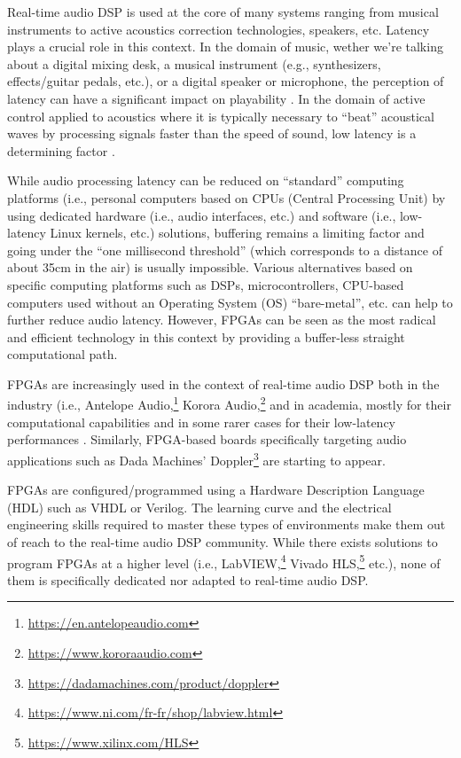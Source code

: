 \documentclass[a4paper,10pt]{article}
\begin{document}
Real-time audio DSP is used at the core of many systems ranging from musical instruments to active acoustics correction technologies, speakers, etc. Latency plays a crucial role in this context.  In the domain of music, wether we're talking about a digital mixing desk, a musical instrument (e.g., synthesizers, effects/guitar pedals, etc.), or a digital speaker or microphone, the perception of latency can have a significant impact on playability \cite{Lago2004}. In the domain of active control applied to acoustics where it is typically necessary to ``beat'' acoustical waves by processing signals faster than the speed of sound, low latency is a determining factor \cite{Zhang2018}.  

While audio processing latency can be reduced on ``standard'' computing platforms (i.e., personal computers based on CPUs (Central Processing Unit) by using dedicated hardware (i.e., audio interfaces, etc.) and software (i.e., low-latency Linux kernels, etc.) solutions, buffering remains a limiting factor and going under the ``one millisecond threshold'' (which corresponds to a distance of about 35cm in the air) is usually impossible. Various alternatives based on specific computing platforms such as DSPs, microcontrollers, CPU-based computers used without an Operating System (OS) ``bare-metal'', etc. can help to further reduce audio latency. However, FPGAs can be seen as the most radical and efficient technology in this context by providing a buffer-less straight computational path. 

FPGAs are increasingly used in the context of real-time audio DSP both in the industry (i.e., Antelope Audio,\footnote{\url{https://en.antelopeaudio.com}} Korora Audio,\footnote{\url{https://www.kororaaudio.com}} and in academia, mostly for their computational capabilities \cite{Choi2013,Pfeifle2012} and in some rarer cases for their low-latency performances \cite{Verstraelen2014}. Similarly, FPGA-based boards specifically targeting audio applications such as Dada Machines' Doppler\footnote{\url{https://dadamachines.com/product/doppler}} are starting to appear. 

FPGAs are configured/programmed using a Hardware Description Language (HDL) such as VHDL or Verilog. The learning curve and the electrical engineering skills required to master these types of environments make them out of reach to the real-time audio DSP community. While there exists solutions to program FPGAs at a higher level (i.e., LabVIEW,\footnote{\url{https://www.ni.com/fr-fr/shop/labview.html}} Vivado HLS,\footnote{\url{https://www.xilinx.com/HLS}} etc.), none of them is specifically dedicated nor adapted to real-time audio DSP. 
\end{document}
